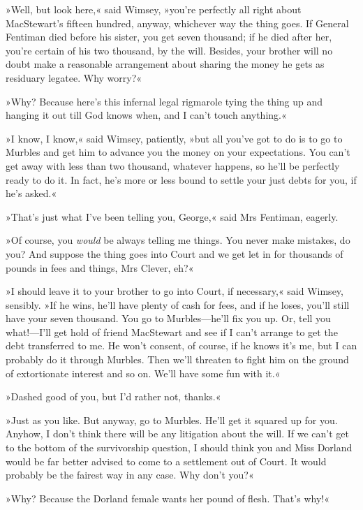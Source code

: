 »Well, but look here,« said Wimsey, »you're perfectly all right about MacStewart's fifteen hundred, anyway, whichever way the thing goes. If General Fentiman died before his sister, you get seven thousand; if he died after her, you're certain of his two thousand, by the will. Besides, your brother will no doubt make a reasonable arrangement about sharing the money he gets as residuary legatee. Why worry?«

»Why? Because here's this infernal legal rigmarole tying the thing up and hanging it out till God knows when, and I can't touch anything.«

»I know, I know,« said Wimsey, patiently, »but all you've got to do is to go to Murbles and get him to advance you the money on your expectations. You can't get away with less than two thousand, whatever happens, so he'll be perfectly ready to do it. In fact, he's more or less bound to settle your just debts for you, if he's asked.«

»That's just what I've been telling you, George,« said Mrs Fentiman, eagerly.

»Of course, you \textit{would} be always telling me things. You never make mistakes, do you? And suppose the thing goes into Court and we get let in for thousands of pounds in fees and things, Mrs Clever, eh?«

»I should leave it to your brother to go into Court, if necessary,« said Wimsey, sensibly. »If he wins, he'll have plenty of cash for fees, and if he loses, you'll still have your seven thousand. You go to Murbles\allowbreak---\allowbreak he'll fix you up. Or, tell you what!---I'll get hold of friend MacStewart and see if I can't arrange to get the debt transferred to me. He won't consent, of course, if he knows it's me, but I can probably do it through Murbles. Then we'll threaten to fight him on the ground of extortionate interest and so on. We'll have some fun with it.«

»Dashed good of you, but I'd rather not, thanks.«

»Just as you like. But anyway, go to Murbles. He'll get it squared up for you. Anyhow, I don't think there will be any litigation about the will. If we can't get to the bottom of the survivorship question, I should think you and Miss Dorland would be far better advised to come to a settlement out of Court. It would probably be the fairest way in any case. Why don't you?«

»Why? Because the Dorland female wants her pound of flesh. That's why!«

